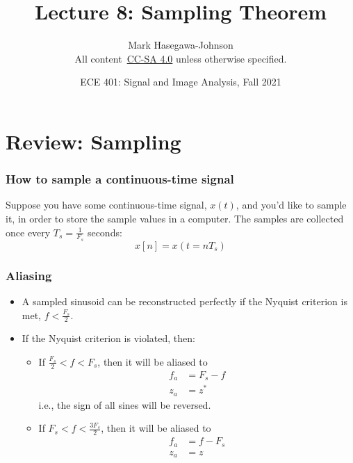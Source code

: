\documentclass{beamer}
\title{Lecture 8: Sampling Theorem}
\author{Mark Hasegawa-Johnson\\All content~\href{https://creativecommons.org/licenses/by-sa/4.0/}{CC-SA 4.0} unless otherwise specified.}
\date{ECE 401: Signal and Image Analysis, Fall 2021}
\begin{document}
\begin{frame}
  \maketitle
\end{frame}

\begin{frame}
  \tableofcontents
\end{frame}

\section[Sampling]{Review: Sampling}
\setcounter{subsection}{1}

\begin{frame}
  \frametitle{How to sample a continuous-time signal}

  Suppose you have some continuous-time signal, $x(t)$, and you'd like
  to sample it, in order to store the sample values in a computer.
  The samples are collected once every $T_s=\frac{1}{F_s}$ seconds:
  \begin{displaymath}
    x[n] = x(t=nT_s)
  \end{displaymath}
\end{frame}

\begin{frame}
  \frametitle{Aliasing}

  \begin{itemize}
  \item A sampled sinusoid can be reconstructed perfectly if the
    Nyquist criterion is met, $f < \frac{F_s}{2}$.
  \item If the Nyquist criterion is violated, then:
    \begin{itemize}
    \item If $\frac{F_s}{2}<f<F_s$, then it will be aliased to
      \begin{align*}
        f_a &= F_s-f\\
        z_a &= z^*
      \end{align*}
      i.e., the sign of all sines will be reversed.
    \item If $F_s < f < \frac{3F_s}{2}$, then it will be aliased to
      \begin{align*}
        f_a &= f-F_s\\
        z_a &= z
      \end{align*}
    \end{itemize}
  \end{itemize}
\end{frame}
\end{document}
